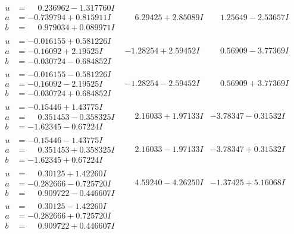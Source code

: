 \documentclass[1p]{elsarticle_modified}
\theoremstyle{definition}
\begin{document}
$$\begin{array}{c|c|c}
\begin{aligned}
u &= \phantom{-}0.236962 - 1.317760 I \\
a &= -0.739794 + 0.815911 I \\
b &= \phantom{-}0.979034 + 0.089971 I\end{aligned}
 & \phantom{-}6.29425 + 2.85089 I & \phantom{-}1.25649 - 2.53657 I \\ \hline\begin{aligned}
u &= -0.016155 + 0.581226 I \\
a &= -0.16092 + 2.19525 I \\
b &= -0.030724 - 0.684852 I\end{aligned}
 & -1.28254 + 2.59452 I & \phantom{-}0.56909 - 3.77369 I \\ \hline\begin{aligned}
u &= -0.016155 - 0.581226 I \\
a &= -0.16092 - 2.19525 I \\
b &= -0.030724 + 0.684852 I\end{aligned}
 & -1.28254 - 2.59452 I & \phantom{-}0.56909 + 3.77369 I \\ \hline\begin{aligned}
u &= -0.15446 + 1.43775 I \\
a &= \phantom{-}0.351453 - 0.358325 I \\
b &= -1.62345 - 0.67224 I\end{aligned}
 & \phantom{-}2.16033 + 1.97133 I & -3.78347 - 0.31532 I \\ \hline\begin{aligned}
u &= -0.15446 - 1.43775 I \\
a &= \phantom{-}0.351453 + 0.358325 I \\
b &= -1.62345 + 0.67224 I\end{aligned}
 & \phantom{-}2.16033 - 1.97133 I & -3.78347 + 0.31532 I \\ \hline\begin{aligned}
u &= \phantom{-}0.30125 + 1.42260 I \\
a &= -0.282666 - 0.725720 I \\
b &= \phantom{-}0.909722 - 0.446607 I\end{aligned}
 & \phantom{-}4.59240 - 4.26250 I & -1.37425 + 5.16068 I \\ \hline\begin{aligned}
u &= \phantom{-}0.30125 - 1.42260 I \\
a &= -0.282666 + 0.725720 I \\
b &= \phantom{-}0.909722 + 0.446607 I\end{aligned}

\end{array}$$
\end{document}
